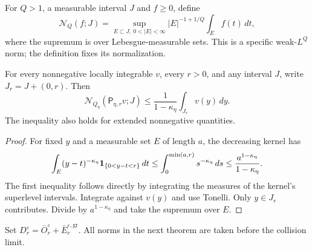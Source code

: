 For $Q>1$, a measurable interval $J$ and $f\ge0$, define
\begin{equation}\label{eq:v83-lorentz-norm}
 \mathcal N_Q(f;J)=\sup_{E\subset J,\ 0<|E|<\infty}
          |E|^{-1+1/Q}\int_E f(t)\,dt,
\end{equation}
where the supremum is over Lebesgue-measurable sets. This is a
specific weak-$L^Q$ norm; the definition fixes its normalization.

\begin{lemma}
\label{lem:v83-potential-norm}
For every nonnegative locally integrable $v$, every $r>0$, and any
interval $J$, write $J_r=J+(0,r)$. Then
\begin{equation}\label{eq:v83-potential-norm}
 \mathcal N_{Q_\eta}(\mathsf P_{\eta,r}v;J)
               \le\frac1{1-\kappa_\eta}\int_{J_r}v(y)\,dy.
\end{equation}
The inequality also holds for extended nonnegative quantities.
\end{lemma}
\begin{proof}
For fixed $y$ and a measurable set $E$ of length $a$, the decreasing
kernel has
\[
 \int_E (y-t)^{-\kappa_\eta}\mathbf1_{\{0<y-t<r\}}\,dt
 \le \int_0^{\min(a,r)}s^{-\kappa_\eta}\,ds
 \le\frac{a^{1-\kappa_\eta}}{1-\kappa_\eta}.
\]
The first inequality follows directly by integrating the measures of
the kernel's superlevel intervals. Integrate against $v(y)$ and use
Tonelli. Only $y\in J_r$ contributes. Divide by
$a^{1-\kappa_\eta}$ and take the supremum over $E$.
\end{proof}

Set $D_r^\varepsilon=\bar O_r^\varepsilon+
\bar E_r^{\varepsilon,\mathrm{gr}}$. All norms in the next theorem
are taken before the collision limit.

